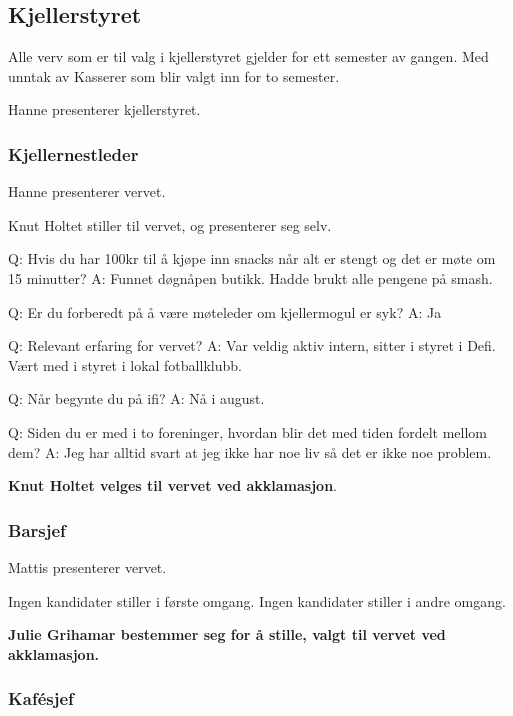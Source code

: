 \documentclass[10pt,norsk,a4paper,usenames,dvipsnames]{article}
\begin{document}
\begin{multicols}{2}
    \subsection{Kjellerstyret} %
        Alle verv som er til valg i kjellerstyret gjelder for ett semester av gangen. Med unntak av Kasserer som blir valgt inn for to semester.

Hanne presenterer kjellerstyret.


        \subsubsection{Kjellernestleder}
        Hanne presenterer vervet.

        Knut Holtet stiller til vervet, og presenterer seg selv.

        Q: Hvis du har 100kr til å kjøpe inn snacks når alt er stengt og det er møte om 15 minutter?
        A: Funnet døgnåpen butikk. Hadde brukt alle pengene på smash.

        Q: Er du forberedt på å være møteleder om kjellermogul er syk?
        A: Ja

        Q: Relevant erfaring for vervet?
        A: Var veldig aktiv intern, sitter i styret i Defi. Vært med i styret i lokal fotballklubb.

        Q: Når begynte du på ifi?
        A: Nå i august.

        Q: Siden du er med i to foreninger, hvordan blir det med tiden fordelt mellom dem?
        A: Jeg har alltid svart at jeg ikke har noe liv så det er ikke noe problem.


        \textbf{Knut Holtet velges til vervet ved akklamasjon}.


        \subsubsection{Barsjef}

        Mattis presenterer vervet.

        Ingen kandidater stiller i første omgang.
        Ingen kandidater stiller i andre omgang.



        \textbf{Julie Grihamar bestemmer seg for å stille, valgt til vervet ved akklamasjon. }


        \subsubsection{Kafésjef}


\end{multicols}
\end{document}
